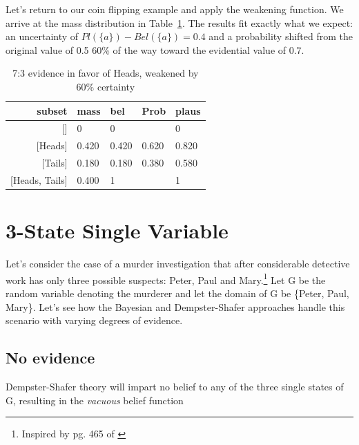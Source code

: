 \documentclass[letterpaper]{article}
\begin{document}
Let's return to our coin flipping example and apply the weakening function.  We arrive at the mass distribution in Table~\ref{tab:CoinFlipWeakened}.  The results fit exactly what we expect: an uncertainty of $Pl(\{a\})-Bel(\{a\})=0.4$ and a probability shifted from the original value of 0.5 60\% of the way toward the evidential value of 0.7.
\begin{table}[htbp]
\centering
\caption{7:3 evidence in favor of Heads, weakened by 60\% certainty}
\begin{tabular}{rllll}
\toprule
                subset&mass &bel  &Prob &plaus\\
\midrule
                    {[]}&0    &0    &     &0    \\
               {[Heads]}&0.420&0.420&0.620&0.820\\
               {[Tails]}&0.180&0.180&0.380&0.580\\
        {[Heads, Tails]}&0.400&1    &     &1    \\
\bottomrule
\end{tabular}
\label{tab:CoinFlipWeakened}
\end{table}

\section{3-State Single Variable}
Let's consider the case of a murder investigation that after considerable detective work has only three possible suspects: Peter, Paul and Mary.\footnote{Inspired by pg. 465 of \cite{Pearl1988}}  Let G be the random variable denoting the murderer and let the domain of G be \{Peter, Paul, Mary\}.  Let's see how the Bayesian and Dempster-Shafer approaches handle this scenario with varying degrees of evidence. 

\subsection{No evidence}

Dempster-Shafer theory will impart no belief to any of the three single states of G, resulting in the \textit{vacuous} belief function




\end{document}
